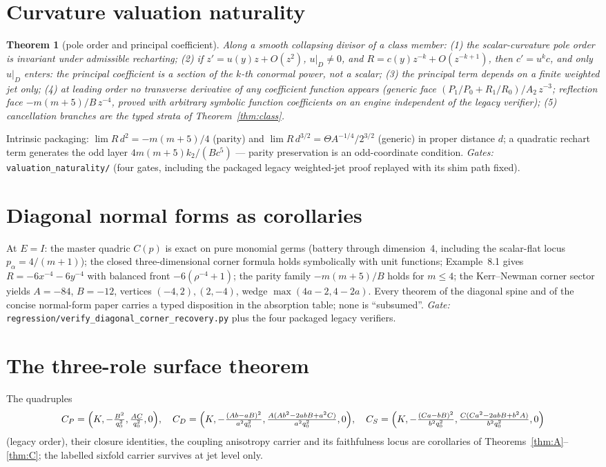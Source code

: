 \documentclass[11pt]{article}
\newtheorem{theorem}{Theorem}
\theoremstyle{definition}
\begin{document}
\section{Curvature valuation naturality}
\begin{theorem}[pole order and principal coefficient]\label{thm:D}
Along a smooth collapsing divisor of a class member: (1) the scalar-curvature pole
order is invariant under admissible recharting; (2) if $z'=u(y)z+O(z^2)$,
$u|_D\neq0$, and $R=c(y)z^{-k}+O(z^{-k+1})$, then $c'=u^kc$, and only $u|_D$
enters: the principal coefficient is a section of the $k$-th conormal power, not a
scalar; (3) the principal term depends on a finite weighted jet only; (4) at
leading order no transverse derivative of any coefficient function appears
(generic face $(P_1/P_0+R_1/R_0)/A_2\,z^{-3}$; reflection face $-m(m+5)/B\,z^{-4}$,
proved with arbitrary symbolic function coefficients on an engine independent of
the legacy verifier); (5) cancellation branches are the typed strata of
Theorem~\ref{thm:class}.
\end{theorem}

Intrinsic packaging: $\lim R\,d^2=-m(m+5)/4$ (parity) and
$\lim R\,d^{3/2}=\Theta A^{-1/4}/2^{3/2}$ (generic) in proper distance $d$; a
quadratic rechart term generates the odd layer $4m(m{+}5)k_2/(Bc^5)$ --- parity
preservation is an odd-coordinate condition. \emph{Gates:}
\texttt{valuation\_naturality/} (four gates, including the packaged legacy
weighted-jet proof replayed with its shim path fixed).

\section{Diagonal normal forms as corollaries}
At $E=I$: the master quadric $C(p)$ is exact on pure monomial germs (battery
through dimension~4, including the scalar-flat locus $p_\alpha=4/(m{+}1)$); the
closed three-dimensional corner formula holds symbolically with unit functions;
Example~8.1 gives $R=-6x^{-4}-6y^{-4}$ with balanced front $-6(\rho^{-4}+1)$; the
parity family $-m(m+5)/B$ holds for $m\le4$; the Kerr--Newman corner sector yields
$A=-84$, $B=-12$, vertices $(-4,2),(2,-4)$, wedge $\max(4a-2,4-2a)$. Every theorem
of the diagonal spine and of the concise normal-form paper carries a typed
disposition in the absorption table; none is ``subsumed''. \emph{Gate:}
\texttt{regression/verify\_diagonal\_corner\_recovery.py} plus the four packaged
legacy verifiers.

\section{The three-role surface theorem}
The quadruples
\[
C_P=\Bigl(K,-\tfrac{B^2}{q_0^2},\tfrac{AC}{q_0^2},0\Bigr),\quad
C_D=\Bigl(K,-\tfrac{(Ab-aB)^2}{a^2q_0^2},\tfrac{A(Ab^2-2abB+a^2C)}{a^2q_0^2},0\Bigr),\quad
C_S=\Bigl(K,-\tfrac{(Ca-bB)^2}{b^2q_0^2},\tfrac{C(Ca^2-2abB+b^2A)}{b^2q_0^2},0\Bigr)
\]
(legacy order), their closure identities, the coupling anisotropy carrier and its
faithfulness locus are corollaries of Theorems~\ref{thm:A}--\ref{thm:C}; the
labelled sixfold carrier survives at jet level only.
\end{document}
